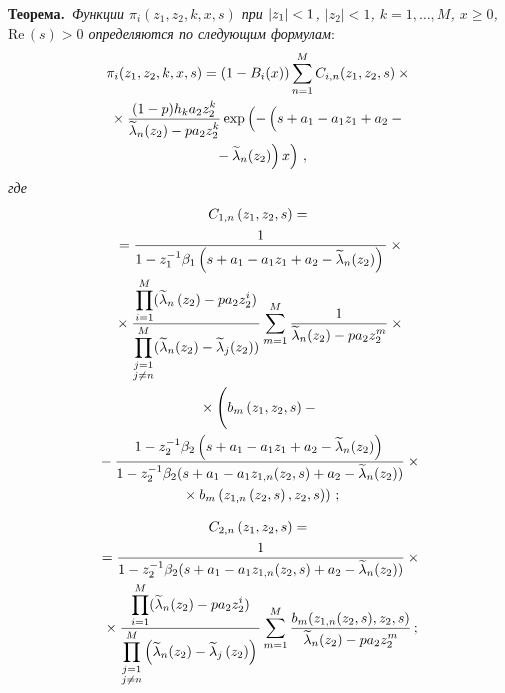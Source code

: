 \begin{multicols}{2}
\smallskip

\noindent
\textbf{Теорема.}\ \textit{Функции $\pi_i(z_1,z_2,k,x,s)$ при $|z_1|\hm<1$,
$|z_2|<1$, $k=1,\ldots,M$, $x\geq 0$, $\mathrm{Re}\,(s)>0$ определяются по
следующим формулам}:
\begin{multline*}
\pi_i(z_1,z_2,k,x,s)=(1-B_i(x))\sum\limits_{n=1}^{M}C_{i,n}(z_1,z_2,s)\times{}\\
{}\times\fr{(1-p)h_k a_2 z_2^k}{\widetilde{\lambda}_n(z_2)-pa_2 z_2^k}
\exp\left(-\left(
\vphantom{\widetilde{\lambda}_n(z_2)}
s+a_1-a_1 z_1+a_2-{}\right.\right.\\
\left.\left.{}-\widetilde{\lambda}_n(z_2)\right)x\right)\,,
\end{multline*}
\textit{где}
\begin{multline*}
C_{1,n}\left(z_1,z_2,s\right)={}\\
{}=\fr{1}{1-z_1^{-1}\beta_1
\left(s+a_1-a_1 z_1+a_2-\widetilde{\lambda}_n(z_2)\right)}\times{}\\
{}\times\fr{\prod\limits_{i=1}^M(\widetilde{\lambda}_n\left(z_2\right)-pa_2 z_2^i)}
{\prod\limits_{\substack{j=1\\j\neq n}}^M(\widetilde{\lambda}_n(z_2)-
\widetilde{\lambda}_j(z_2))}
\sum\limits_{m=1}^M\fr{1}{\widetilde{\lambda}_n(z_2)-pa_2 z_2^m}\times{}\\
{}\times\left(
\vphantom{\fr{1-\tilde{\Lambda}_2^{-1}}{1-z_2^{-1}}}
b_m\left(z_1,z_2,s\right)-{}\right.\\
{}-\fr{1-z_2^{-1}\beta_2\left(s+a_1-a_1 z_1+a_2-
\widetilde{\lambda}_n(z_2)\right)}
{1-z_2^{-1}\beta_2(s+a_1-a_1 z_{1,n}(z_2,s)+a_2-\widetilde{\lambda}_n(z_2))}\times{}\\
\left.{}\times b_m\left(z_{1,n}\left(z_2,s\right),z_2,s\right)\right)\,;
\end{multline*}

\vspace*{-12pt}

\noindent
\begin{multline*}
C_{2,n}\left(z_1,z_2,s\right)={}\\
{}=\displaystyle\frac{\displaystyle 1\mathstrut}{\displaystyle 1-z_2^{-1}\beta_2(s+a_1-a_1 z_{1,n}
(z_2,s)+a_2-\widetilde{\lambda}_n(z_2))\mathstrut}\times{}\\
{}\times\displaystyle\frac{\displaystyle \prod\limits_{i=1}^M(\widetilde{\lambda}_n(z_2)-pa_2 z_2^i)\mathstrut}{\displaystyle \prod\limits_{\substack{j=1\\j\neq n}}^M\left(\widetilde{\lambda}_n(z_2)-
\widetilde{\lambda}_j\left(z_2\right)\right)\mathstrut}
\sum\limits_{m=1}^M\displaystyle\frac{\displaystyle b_m(z_{1,n}(z_2,s),z_2,s)\mathstrut}{\displaystyle \widetilde{\lambda}_n(z_2)-pa_2 z_2^m\mathstrut}\,;\hspace*{-0.39255pt}
\end{multline*}


\end{multicols}
